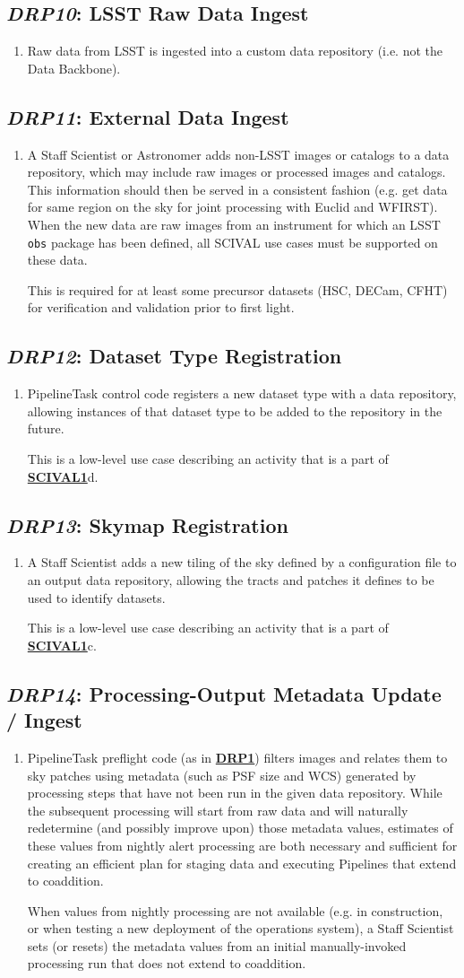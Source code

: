 \documentclass[DM,toc,lsstdraft]{lsstdoc}
\newcommand{\usecase}[3]{%
\subsection{\emph{#1}: #2}
\label{use:#1}
\begin{enumerate}[label=\alph*.]
#3
\end{enumerate}
}
\newcommand{\useref}[1]{\hyperref[use:#1]{\textcolor{lsstblue}{\textbf{#1}}}}
\begin{document}
\usecase{DRP10}{LSST Raw Data Ingest}{%

\item
Raw data from LSST is ingested into a custom data repository (i.e. not the Data Backbone).
}

\usecase{DRP11}{External Data Ingest}{%

\item
A Staff Scientist or Astronomer adds non-LSST images or catalogs to a data repository, which may include raw images or processed images and catalogs.
This information should then be served in a consistent fashion (e.g. get data for same region on the sky for joint processing with Euclid and WFIRST).
When the new data are raw images from an instrument for which an LSST \texttt{obs} package has been defined, all SCIVAL use cases must be supported on these data.

This is required for at least some precursor datasets (HSC, DECam, CFHT) for verification and validation prior to first light.
}

\usecase{DRP12}{Dataset Type Registration}{%

\item
PipelineTask control code registers a new dataset type with a data repository, allowing instances of that dataset type to be added to the repository in the future.

This is a low-level use case describing an activity that is a part of \useref{SCIVAL1}d.
}

\usecase{DRP13}{Skymap Registration}{%

\item
A Staff Scientist adds a new tiling of the sky defined by a configuration file to an output data repository, allowing the tracts and patches it defines to be used to identify datasets.

This is a low-level use case describing an activity that is a part of \useref{SCIVAL1}c.
}

\usecase{DRP14}{Processing-Output Metadata Update / Ingest}{%

\item
PipelineTask preflight code (as in \useref{DRP1}) filters images and relates them to sky patches using metadata (such as PSF size and WCS) generated by processing steps that have not been run in the given data repository.
While the subsequent processing will start from raw data and will naturally redetermine (and possibly improve upon) those metadata values, estimates of these values from nightly alert processing are both necessary and sufficient for creating an efficient plan for staging data and executing Pipelines that extend to coaddition.

When values from nightly processing are not available (e.g. in construction, or when testing a new deployment of the operations system), a Staff Scientist sets (or resets) the metadata values from an initial manually-invoked processing run that does not extend to coaddition.
}
\end{document}
